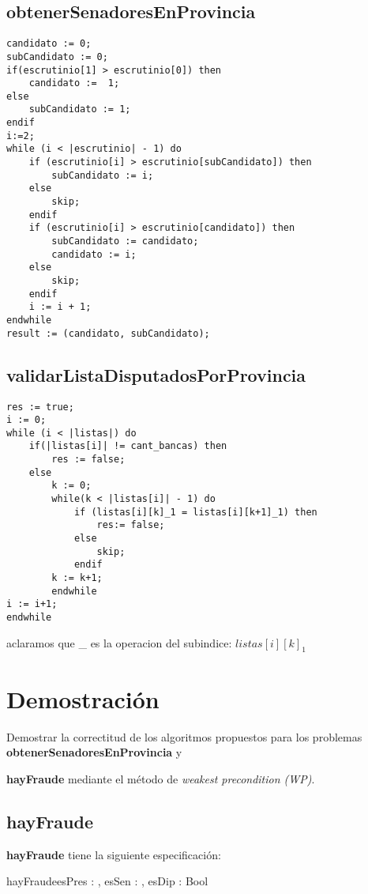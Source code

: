\documentclass[10pt,a4paper]{article}
\begin{document}
\pagebreak


\subsection{obtenerSenadoresEnProvincia}
\begin{lstlisting}
candidato := 0;
subCandidato := 0;
if(escrutinio[1] > escrutinio[0]) then
    candidato :=  1;
else
    subCandidato := 1;
endif
i:=2;
while (i < |escrutinio| - 1) do
	if (escrutinio[i] > escrutinio[subCandidato]) then
		subCandidato := i;
	else
		skip;
	endif
	if (escrutinio[i] > escrutinio[candidato]) then
	    subCandidato := candidato;
	    candidato := i;
	else
		skip;
	endif
	i := i + 1;
endwhile
result := (candidato, subCandidato);
\end{lstlisting}
\pagebreak




\subsection{validarListaDisputadosPorProvincia}
\begin{lstlisting}
res := true;
i := 0;
while (i < |listas|) do
    if(|listas[i]| != cant_bancas) then
        res := false;
    else
		k := 0;
        while(k < |listas[i]| - 1) do
            if (listas[i][k]_1 = listas[i][k+1]_1) then
                res:= false;
			else
				skip;
            endif
        k := k+1;
        endwhile
i := i+1;
endwhile
\end{lstlisting} 
aclaramos que \_ es la operacion del subindice: $listas[i][k]_{1}$
\pagebreak


\section{Demostración}

Demostrar la correctitud de los algoritmos propuestos para los problemas \textbf{obtenerSenadoresEnProvincia} y 

\textbf{hayFraude} mediante el método de \textit{weakest precondition (WP)}.

\subsection{hayFraude}

\textbf{hayFraude} tiene la siguiente especificación:

\begin{proc}{hayFraude}{\In esPres : \TLista{\ent}, \In esSen : \TLista{\ent}, \In esDip : \TLista{\ent}}{Bool} 
\end{proc}
\end{document}
